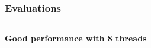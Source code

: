 \documentclass{beamer}
\begin{document}
\begin{frame}
\frametitle{Evaluations}
\begin{columns}
\begin{column}{6cm}
\end{column}
\begin{column}{6cm}
\end{column}
\end{columns}
\begin{center}
\textbf{Good performance with 8 threads}
\end{center}
\end{frame}
\end{document}
